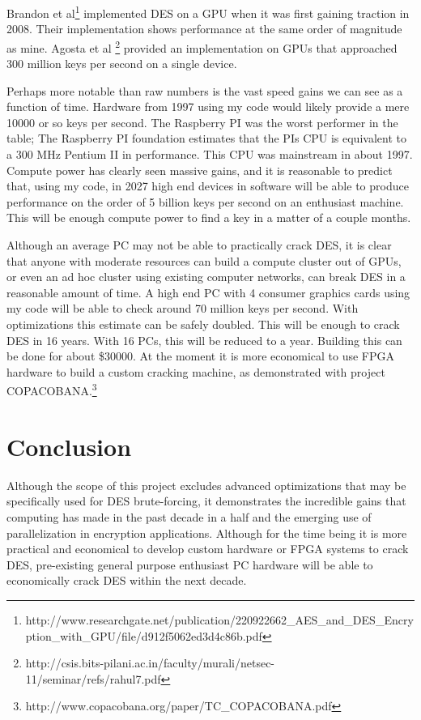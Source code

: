 \documentclass[12pt]{article}
\begin{document}
 Brandon et al\footnote{http://www.researchgate.net/publication/220922662\_AES\_and\_DES\_Encryption\_with\_GPU/file/d912f5062ed3d4c86b.pdf} implemented DES on a GPU when it was first gaining traction in 
2008. Their implementation shows performance at the same order of magnitude as mine. Agosta et al
\footnote{http://csis.bits-pilani.ac.in/faculty/murali/netsec-11/seminar/refs/rahul7.pdf} provided an implementation on GPUs that approached 300 million keys per second on a single device.

Perhaps more notable than raw numbers is the vast speed gains we can see as a function of time.
Hardware from 1997 using my code would likely provide a mere 10000 or so keys per second.
The Raspberry PI was the worst performer in the table; The Raspberry PI foundation estimates that the
PIs CPU is equivalent to a 300 MHz Pentium II in performance. This CPU was mainstream in about 1997.
Compute power has clearly seen massive gains, and it is reasonable to predict that, using my code,
in 2027 high end devices in software will be able to produce performance on the order of 5 billion
keys per second on an enthusiast machine. This will 
be enough compute power to find a key in a matter 
of a couple months. 

Although an average PC may not be able to practically crack DES, it is clear that anyone with
moderate resources can build a compute cluster out of GPUs, or even an ad hoc cluster using 
existing computer networks, can break DES in a reasonable amount of time. A high end PC with 4 consumer 
graphics cards using my code will be able to check around 70 million keys per second. With optimizations
this estimate can be safely doubled. This will be enough to crack DES in 16 years. With 16 PCs, this will be
reduced to a year. Building this can be done for about \$30000. At the moment it is
more economical to use FPGA hardware to build a custom cracking machine, as demonstrated
with project COPACOBANA.\footnote{http://www.copacobana.org/paper/TC\_COPACOBANA.pdf}

\section{Conclusion}

Although the scope of this project excludes advanced optimizations that may be specifically used
for DES brute-forcing, it demonstrates the incredible gains that computing has made in the past
decade in a half and the emerging use of parallelization in encryption applications. Although for
the time being it is more practical and economical to develop custom hardware or FPGA systems to
crack DES, pre-existing general purpose enthusiast PC hardware will be able to economically
crack DES within the next decade.




\end{document}
